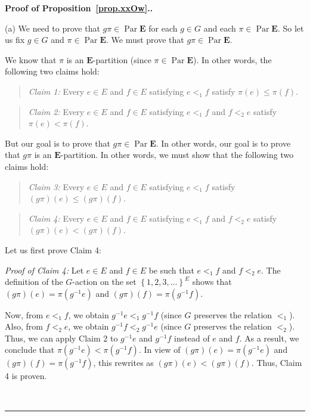 \documentclass[numbers=enddot,12pt,final,onecolumn,notitlepage,abstracton]{scrartcl}
\theoremstyle{definition}
\newenvironment{statement}{\begin{quote}}{\end{quote}}
\newenvironment{proof}[1][Proof]{\noindent\textbf{#1.} }{\ \rule{0.5em}{0.5em}}
\newenvironment{verlong}{}{}
\newcommand{\Par}{\operatorname{Par}}
\newcommand{\EE}{{\mathbf{E}}}
\begin{document}
\begin{verlong}
\begin{proof}[Proof of Proposition~\ref{prop.xxOw}.]

(a) We need to prove that $g \pi \in \Par \EE$ for each $g \in G$ and
each $\pi \in \Par \EE$. So let us fix $g \in G$ and $\pi \in \Par \EE$.
We must prove that $g \pi \in \Par \EE$.

We know that $\pi$ is an $\EE$-partition (since $\pi \in \Par \EE$).
In other words, the following two claims hold:

\begin{statement}
\textit{Claim 1:} Every $e \in E$ and $f \in E$ satisfying $e <_1 f$
satisfy $\pi\left(e\right) \leq \pi\left(f\right)$.
\end{statement}

\begin{statement}
\textit{Claim 2:} Every $e \in E$ and $f \in E$ satisfying $e <_1 f$
and $f <_2 e$ satisfy $\pi\left(e\right) < \pi\left(f\right)$.
\end{statement}

But our goal is to prove that $g \pi \in \Par \EE$. In other words,
our goal is to prove that $g \pi$ is an $\EE$-partition. In other
words, we must show that the following two claims hold:

\begin{statement}
\textit{Claim 3:} Every $e \in E$ and $f \in E$ satisfying $e <_1 f$
satisfy
$\left(g \pi\right)\left(e\right) \leq \left(g \pi\right)\left(f\right)$.
\end{statement}

\begin{statement}
\textit{Claim 4:} Every $e \in E$ and $f \in E$ satisfying $e <_1 f$
and $f <_2 e$ satisfy
$\left(g \pi\right)\left(e\right) < \left(g \pi\right)\left(f\right)$.
\end{statement}

Let us first prove Claim 4:

\textit{Proof of Claim 4:} Let $e \in E$ and $f \in E$ be such that
$e <_1 f$ and $f <_2 e$. The definition of the $G$-action on the set
$\left\{1, 2, 3, \ldots\right\}^E$ shows that
$\left(g \pi\right) \left(e\right) = \pi \left(g^{-1} e\right)$ and
$\left(g \pi\right) \left(f\right) = \pi \left(g^{-1} f\right)$.

Now, from $e <_1 f$, we obtain
$g^{-1} e <_1 g^{-1} f$ (since $G$ preserves
the relation $<_1$). Also, from $f <_2 e$, we obtain
$g^{-1} f <_2 g^{-1} e$ (since $G$ preserves
the relation $<_2$). Thus, we can apply Claim 2 to
$g^{-1} e$ and $g^{-1} f$ instead of $e$ and $f$. As a result, we
conclude that
$\pi \left(g^{-1} e\right) < \pi \left(g^{-1} f\right)$. In view of
$\left(g \pi\right) \left(e\right) = \pi \left(g^{-1} e\right)$ and
$\left(g \pi\right) \left(f\right) = \pi \left(g^{-1} f\right)$, this
rewrites as
$\left(g \pi\right)\left(e\right) < \left(g \pi\right)\left(f\right)$.
Thus, Claim 4 is proven.


\end{proof}
\end{verlong}
\end{document}
